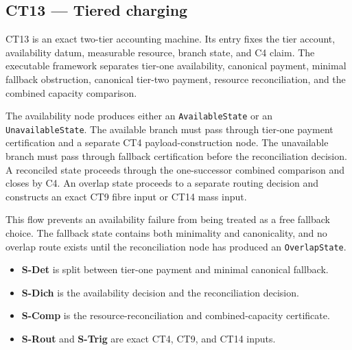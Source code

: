 \subsection{CT13 --- Tiered charging}\label{ct:13}\label{tiered-charging-scheme-failure-as-a-demand}

CT13 is an exact two-tier accounting machine.  Its entry fixes the tier
account, availability datum, measurable resource, branch state, and C4 claim.
The executable framework separates tier-one availability, canonical payment,
minimal fallback obstruction, canonical tier-two payment, resource
reconciliation, and the combined capacity comparison.

The availability node produces either an \texttt{AvailableState} or an
\texttt{UnavailableState}.  The available branch must pass through tier-one
payment certification and a separate CT4 payload-construction node.  The
unavailable branch must pass through fallback certification before the
reconciliation decision.  A reconciled state proceeds through the one-successor
combined comparison and closes by C4.  An overlap state proceeds to a separate
routing decision and constructs an exact CT9 fibre input or CT14 mass input.

This flow prevents an availability failure from being treated as a free
fallback choice.  The fallback state contains both minimality and canonicality,
and no overlap route exists until the reconciliation node has produced an
\texttt{OverlapState}.

\begin{itemize}
\tightlist
\item \textbf{S-Det} is split between tier-one payment and minimal canonical fallback.
\item \textbf{S-Dich} is the availability decision and the reconciliation decision.
\item \textbf{S-Comp} is the resource-reconciliation and combined-capacity certificate.
\item \textbf{S-Rout} and \textbf{S-Trig} are exact CT4, CT9, and CT14 inputs.
\end{itemize}

